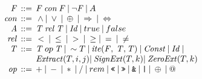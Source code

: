 \documentclass[a4paper]{llncs}
\begin{document}
\[\begin{array}{r@{\:\:}c@{\:\:}l}
\\[-5ex]
\mathit{F}  & ::= & \mathit{F} \: \mathit{con} \: \mathit{F} \:
                    | \: \neg\mathit{F} \:
                    | \: A \\
\mathit{con}  & ::= & \: \wedge \: 
                    | \: \vee \: 
                    | \: \oplus \:
                    | \: \Rightarrow \:
                    | \: \Leftrightarrow \: \\                    
\mathit{A} & ::= &  \mathit{T} \: \mathit{rel} \: \mathit{T} \:
                    | \: \mathit{Id} \: | \: true \: | \: false \\
\mathit{rel}  & ::= & \: < \: 
                    | \: \leq \: 
                    | \: > \: 
                    | \: \geq
                    | \: = \: 
                    | \: \neq \: \\
\mathit{T}  & ::= &  \mathit{T} \: op \: \mathit{T} \: 
                    | \: \sim T \:
                    | \: \mathit{ite}(\mathit{F}, \: \mathit{T}, \mathit{T}) \: 
                    | \: \mathit{Const} \: 
                    | \: \mathit{Id} \: | \\  
              &   & \mathit{Extract}(T, i, j) 
                    | \: \mathit{SignExt}(T, k)
                    | \: \mathit{ZeroExt}(T, k) \\
\mathit{op}   & ::= & + \: 
                    | \: - \: 
                    | \: * \: 
                    | \: / \: 
                    | \: rem \: 
                    | \: \texttt{<<} \: 
                    | \: \texttt{>>} \: 
                    | \: \texttt{\&} \: 
                    | \: \texttt{|} \: 
                    | \: \oplus \: 
                    | \: @ \:  
\end{array}
\]
\end{document}
